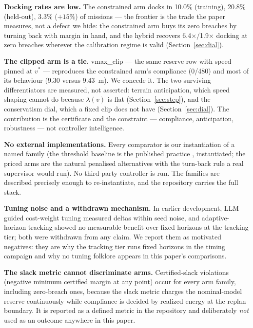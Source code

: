 \documentclass[preprint,12pt]{elsarticle}
\begin{document}
\textbf{Docking rates are low.} The constrained arm docks in 10.0\%
(training), 20.8\% (held-out), 3.3\% ($+15\%$) of missions --- the
frontier is the trade the paper measures, not a defect we hide: the
constrained arm buys its zero breaches by turning back with margin
in hand, and the hybrid recovers 6.4$\times$/1.9$\times$ docking at
zero breaches wherever the calibration regime is valid
(Section~\ref{sec:dial}).

\textbf{The clipped arm is a tie.} vmax\_clip --- the same reserve
row with speed pinned at $v^{*}$ --- reproduces the constrained
arm's compliance (0/480) and most of its behaviour (9.30 versus
9.43~m). We concede it. The two surviving differentiators are
measured, not asserted: terrain anticipation, which speed shaping
cannot do because $\lambda(v)$ is flat
(Section~\ref{sec:step}), and the conservatism dial, which a fixed
clip does not have (Section~\ref{sec:dial}). The contribution is
the certificate and the constraint --- compliance, anticipation,
robustness --- not controller intelligence.

\textbf{No external implementations.} Every comparator is our
instantiation of a named family (the threshold baseline is the
published practice \cite{huang2015adaptive}, instantiated; the
priced arms are the natural penalised alternatives with the
turn-back rule a real supervisor would run). No third-party
controller is run. The families are described precisely enough to
re-instantiate, and the repository carries the full stack.

\textbf{Tuning noise and a withdrawn mechanism.} In earlier
development, LLM-guided cost-weight tuning measured deltas within
seed noise, and adaptive-horizon tracking showed no measurable
benefit over fixed horizons at the tracking tier; both were
withdrawn from any claim. We report them as motivated negatives:
they are why the tracking tier runs fixed horizons in the timing
campaign and why no tuning folklore appears in this paper's
comparisons.

\textbf{The slack metric cannot discriminate arms.} Certified-slack
violations (negative minimum certified margin at any point) occur
for every arm family, including zero-breach ones, because the slack
metric charges the nominal-model reserve continuously while
compliance is decided by realized energy at the replan boundary. It
is reported as a defined metric in the repository and deliberately
\emph{not} used as an outcome anywhere in this paper.

\end{document}
